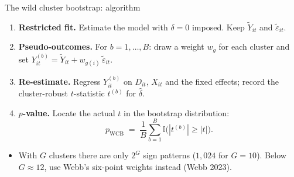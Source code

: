 \documentclass[
  11pt,
  ignorenonframetext,
  aspectratio=169,
]{beamer}
\providecommand{\tightlist}{%
  \setlength{\itemsep}{0pt}\setlength{\parskip}{0pt}}
\begin{document}
\begin{frame}{The wild cluster bootstrap: algorithm}
\protect{}\label{the-wild-cluster-bootstrap-algorithm}
\begin{enumerate}
\tightlist
\item
  \textbf{Restricted fit.} Estimate the model with \(\delta = 0\)
  imposed. Keep \(\tilde Y_{it}\) and \(\tilde\varepsilon_{it}\).
\item
  \textbf{Pseudo-outcomes.} For \(b = 1, \dots, B\): draw a weight
  \(w_g\) for each cluster and set
  \(Y^{(b)}_{it} = \tilde Y_{it} + w_{g(i)}\,\tilde\varepsilon_{it}\).
\item
  \textbf{Re-estimate.} Regress \(Y^{(b)}_{it}\) on \(D_{it}\),
  \(X_{it}\) and the fixed effects; record the cluster-robust
  \(t\)-statistic \(t^{(b)}\) for \(\hat\delta\).
\item
  \textbf{\(p\)-value.} Locate the actual \(t\) in the bootstrap
  distribution: \[
  p_{\text{WCB}} \;=\; \frac{1}{B}\sum_{b=1}^{B} \mathbb{I}\big( |t^{(b)}| \ge |t| \big) .
  \]
\end{enumerate}

\begin{itemize}
\tightlist
\item
  With \(G\) clusters there are only \(2^G\) sign patterns (\(1{,}024\)
  for \(G = 10\)). Below \(G \approx 12\), use Webb's six-point weights
  instead (Webb 2023).
\end{itemize}
\end{frame}
\end{document}
